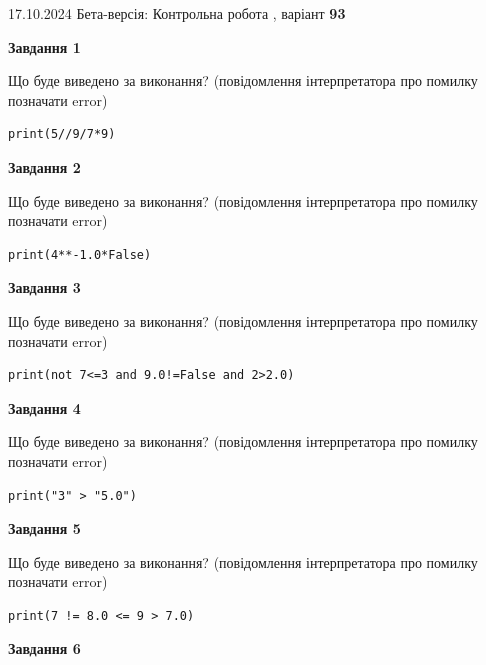 \documentclass[12pt, ukrainian]{article}
\begin{document}
{\Large{17.10.2024 Бета-версія: Контрольна робота , варіант  \No \textbf { 93 }\par}}
{
\begin {large}
{\begin {center}\textbf{Завдання 1}\end {center}}

Що буде виведено за виконання? (повідомлення інтерпретатора про помилку позначати error)\par
\begin{verbatim}
print(5//9/7*9)
\end{verbatim}

{\begin {center}\textbf{Завдання 2}\end {center}}

Що буде виведено за виконання? (повідомлення інтерпретатора про помилку позначати error)\par
\begin{verbatim}
print(4**-1.0*False)
\end{verbatim}

{\begin {center}\textbf{Завдання 3}\end {center}}

Що буде виведено за виконання? (повідомлення інтерпретатора про помилку позначати error)\par
\begin{verbatim}
print(not 7<=3 and 9.0!=False and 2>2.0)
\end{verbatim}

{\begin {center}\textbf{Завдання 4}\end {center}}

Що буде виведено за виконання? (повідомлення інтерпретатора про помилку позначати error)\par
\begin{verbatim}
print("3" > "5.0")
\end{verbatim}

{\begin {center}\textbf{Завдання 5}\end {center}}

Що буде виведено за виконання? (повідомлення інтерпретатора про помилку позначати error)\par
\begin{verbatim}
print(7 != 8.0 <= 9 > 7.0)
\end{verbatim}

{\begin {center}\textbf{Завдання 6}\end {center}}


\end{large}}
\end{document}
